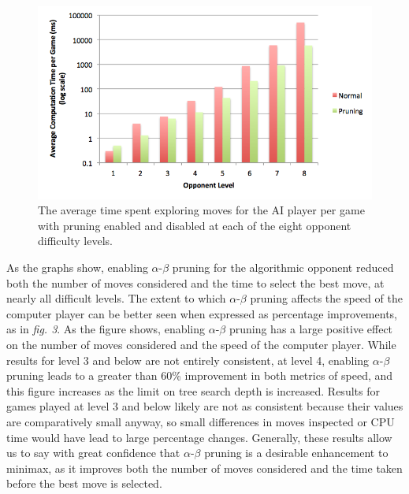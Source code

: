 \documentclass{article}
\begin{document}
\begin{doublespace}
\begin{figure}[ht!]
\centering
\includegraphics[width=6.5in]{../Data/Graphs/Graph3}
\caption{The average time spent exploring moves for the AI player per game with pruning enabled and disabled at each of the eight opponent difficulty levels.}
\end{figure}

As the graphs show, enabling $\alpha$-$\beta$ pruning for the algorithmic opponent reduced both the number of moves considered and the time to select the best move, at nearly all difficult levels. The extent to which $\alpha$-$\beta$ pruning affects the speed of the computer player can be better seen when expressed as percentage improvements, as in \textit{fig. 3}. As the figure shows, enabling $\alpha$-$\beta$ pruning has a large positive effect on the number of moves considered and the speed of the computer player. While results for level 3 and below are not entirely consistent, at level 4, enabling $\alpha$-$\beta$ pruning leads to a greater than 60\% improvement in both metrics of speed, and this figure increases as the limit on tree search depth is increased. Results for games played at level 3 and below likely are not as consistent because their values are comparatively small anyway, so small differences in moves inspected or CPU time would have lead to large percentage changes. Generally, these results allow us to say with great confidence that $\alpha$-$\beta$ pruning is a desirable enhancement to minimax, as it improves both the number of moves considered and the time taken before the best move is selected.

\newpage


\end{doublespace}
\end{document}
